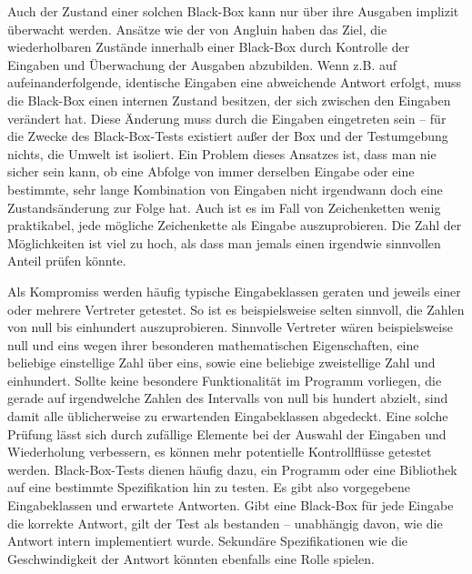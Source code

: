 Auch der Zustand einer solchen Black-Box kann nur über ihre Ausgaben
implizit überwacht werden. Ansätze wie der von Angluin\cite{angluin}
haben das Ziel, die wiederholbaren Zustände innerhalb einer Black-Box
durch Kontrolle der Eingaben und Überwachung der Ausgaben abzubilden.
Wenn z.B. auf aufeinanderfolgende,
identische Eingaben eine abweichende Antwort erfolgt, muss die Black-Box
einen internen Zustand besitzen, der sich zwischen den Eingaben verändert hat.
Diese Änderung muss durch die Eingaben eingetreten sein -- für die Zwecke
des Black-Box-Tests existiert außer der Box und der Testumgebung nichts,
die Umwelt ist isoliert. Ein Problem dieses Ansatzes ist, dass man nie
sicher sein kann, ob eine Abfolge von immer derselben Eingabe oder
eine bestimmte, sehr lange Kombination von Eingaben nicht irgendwann
doch eine Zustandsänderung zur Folge hat. Auch ist es im Fall von
Zeichenketten wenig praktikabel, jede mögliche Zeichenkette
als Eingabe auszuprobieren. Die Zahl der Möglichkeiten ist viel zu hoch,
als dass man jemals einen irgendwie sinnvollen Anteil prüfen könnte.

Als Kompromiss werden häufig typische Eingabeklassen geraten und
jeweils einer oder mehrere Vertreter getestet. So ist es beispielsweise 
selten sinnvoll, die Zahlen von null bis einhundert auszuprobieren.
Sinnvolle Vertreter wären beispielsweise null und eins wegen ihrer
besonderen mathematischen Eigenschaften, eine beliebige einstellige
Zahl über eins, sowie eine beliebige zweistellige Zahl und einhundert.
Sollte keine besondere Funktionalität im Programm vorliegen, die
gerade auf irgendwelche Zahlen des Intervalls von null bis hundert
abzielt, sind damit alle üblicherweise zu erwartenden Eingabeklassen 
abgedeckt. Eine solche Prüfung lässt sich durch zufällige Elemente
bei der Auswahl der Eingaben und Wiederholung verbessern,
es können mehr potentielle Kontrollflüsse getestet werden.
Black-Box-Tests dienen häufig dazu, ein Programm oder eine
Bibliothek auf eine bestimmte Spezifikation hin zu testen.
Es gibt also vorgegebene Eingabeklassen und erwartete Antworten.
Gibt eine Black-Box für jede Eingabe die korrekte Antwort,
gilt der Test als bestanden -- unabhängig davon, wie die
Antwort intern implementiert wurde. Sekundäre Spezifikationen
wie die Geschwindigkeit der Antwort könnten ebenfalls eine
Rolle spielen.

